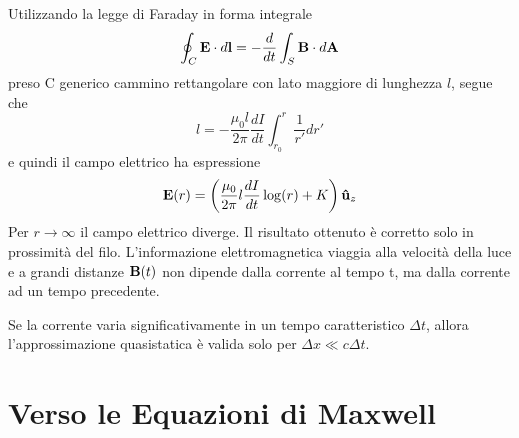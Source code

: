Utilizzando la legge di Faraday in forma integrale 
\begin{equation*}
	\oint_{C} \bold{E} \cdot d \bold{l} = - \frac{d}{dt} \int_S \bold{B} \cdot d \bold{A}
\end{equation*}
preso C generico cammino rettangolare con lato maggiore di lunghezza $l$, segue che  
\begin{equation*}
	[E(r_0) - E(r)]l = - \frac{\mu_0 l}{2 \pi} \frac{d I}{dt} \int_{r_0}^{r} \frac{1}{r'}dr'
\end{equation*}
e quindi il campo elettrico ha espressione
\begin{equation*}
	\bold{E}(r) = \left(\frac{\mu_0}{2\pi}l \frac{dI}{dt} \log(r) + K\right)\bold{\hat{u}}_z
\end{equation*}
Per $r \to \infty$ il campo elettrico diverge. Il risultato ottenuto \`e corretto solo in prossimit\`a del filo. L'informazione elettromagnetica viaggia alla velocit\`a della luce e a grandi distanze $\bold{B}(t)$ non dipende dalla corrente al tempo t, ma dalla corrente ad un tempo precedente.
\newline

Se la corrente varia significativamente in un tempo caratteristico $\Delta t$, allora l'approssimazione quasistatica \`e valida solo per $\Delta x \ll c \Delta t$. 

\section{Verso le Equazioni di Maxwell}

